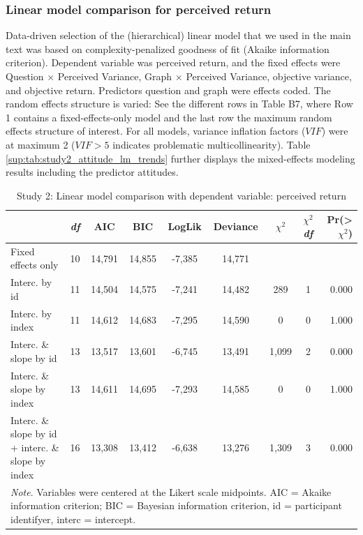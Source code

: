 \subsubsection{Linear model comparison for perceived return}
Data-driven selection of the (hierarchical) linear model that we used in the main text was based on complexity-penalized goodness of fit (Akaike information criterion). Dependent variable was perceived return, and the fixed effects were Question $\times$ Perceived Variance, Graph $\times$ Perceived Variance, objective variance, and objective return. Predictors question and graph were effects coded. The random effects structure is varied: See the different rows in Table B7, where Row 1 contains a fixed-effects-only model and the last row the maximum random effects structure of interest. For all models, variance inflation factors ($VIF$) were at maximum 2 ($VIF > 5$ indicates problematic multicollinearity). Table \ref{sup:tab:study2_attitude_lm_trends} further displays the mixed-effects modeling results including the predictor attitudes.
\begin{table}[H]
\centering
\caption{Study 2: Linear model comparison with dependent variable: perceived return} 
\label{tab:study2_lm_return_modelcomparison}
\begin{tabular}{p{4.3cm}cccccccr}
  \toprule
 & \textit{df} & AIC & BIC & LogLik & Deviance & $\chi^2$ & $\chi^2$\textit{df} & Pr(>$\chi^2$) \\ 
  \midrule
Fixed effects only & 10 & 14,791 & 14,855 & -7,385 & 14,771 &  &  &  \\ 
  Interc. by id & 11 & 14,504 & 14,575 & -7,241 & 14,482 & 289 & 1 & 0.000 \\ 
  Interc. by index & 11 & 14,612 & 14,683 & -7,295 & 14,590 & 0 & 0 & 1.000 \\ 
  Interc. \& slope by id & 13 & 13,517 & 13,601 & -6,745 & 13,491 & 1,099 & 2 & 0.000 \\ 
  Interc. \& slope by index & 13 & 14,611 & 14,695 & -7,293 & 14,585 & 0 & 0 & 1.000 \\ 
  Interc. \& slope by id + interc. \& slope by index & 16 & 13,308 & 13,412 & -6,638 & 13,276 & 1,309 & 3 & 0.000 \\ 
   \bottomrule
   \multicolumn{9}{l}{\small\textit{Note}. Variables were centered at the Likert scale midpoints. AIC = Akaike information criterion; BIC = Bayesian information criterion, id = participant identifyer, interc = intercept.}\end{tabular}
\end{table}


